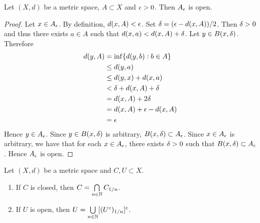 \documentclass{book}
\begin{document}
\begin{ex} 
	Let $(X, d)$ be a metric space, $A \subset X$ and $\epsilon >0$. Then $A_{\epsilon}$ is open. 
\end{ex}

\begin{proof}
	Let $x \in A_{\epsilon}$. By definition, $d(x, A) < \epsilon$. Set $\delta = (\epsilon - d(x,A)) / 2$. Then $\delta > 0$ and thus there exists $a \in A$ such that $d(x,a) < d(x, A) + \delta$. Let $y \in B(x, \delta)$. Therefore
	\begin{align*}
		d(y, A)
		& = \inf \{d(y, b): b \in A\} \\
		& \leq d(y, a) \\
		& \leq d(y, x) + d(x, a) \\
		& < \delta + d(x, A) + \delta \\
		& = d(x, A) + 2\delta \\
		& = d(x, A) + \epsilon - d(x, A) \\
		& = \epsilon 
	\end{align*}
	Hence $y \in A_{\epsilon}$. Since $y \in B(x, \delta)$ is arbitrary, $B(x, \delta) \subset A_{\epsilon}$. Since $x \in A_{\epsilon}$ is arbitrary, we have that for each $x \in A_{\epsilon}$, there exists $\delta > 0$ such that $B(x, \delta) \subset A_{\epsilon}$. Hence $A_{\epsilon}$ is open.
\end{proof}

\begin{ex} 
	Let $(X, d)$ be a metric space and $C, U \subset X$. 
	\begin{enumerate}
		\item If $C$ is closed, then $C = \bigcap\limits_{n \in \mathbb{N}} C_{1/n}$.
		\item If $U$ is open, then $U = \bigcup\limits_{n \in \mathbb{N}} [(U^c)_{1/n}]^c$.
	\end{enumerate} 
\end{ex}
\end{document}
